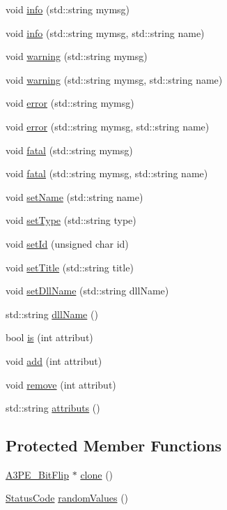 \begin{DoxyCompactItemize}
\item 
void \hyperlink{classObject_a644fd329ea4cb85f54fa6846484b84a8}{info} (std::string mymsg)
\item 
void \hyperlink{classObject_a1ca123253dfd30fc28b156f521dcbdae}{info} (std::string mymsg, std::string name)
\item 
void \hyperlink{classObject_a65cd4fda577711660821fd2cd5a3b4c9}{warning} (std::string mymsg)
\item 
void \hyperlink{classObject_a11f101db4dd73d9391b0231818881d86}{warning} (std::string mymsg, std::string name)
\item 
void \hyperlink{classObject_a204a95f57818c0f811933917a30eff45}{error} (std::string mymsg)
\item 
void \hyperlink{classObject_ad7f6c457733082efa2f9ff5f5c8e119a}{error} (std::string mymsg, std::string name)
\item 
void \hyperlink{classObject_aad5a16aac7516ce65bd5ec02ab07fc80}{fatal} (std::string mymsg)
\item 
void \hyperlink{classObject_ae62acd3d09f716220f75f252dc38bc9a}{fatal} (std::string mymsg, std::string name)
\item 
void \hyperlink{classObject_ae30fea75683c2d149b6b6d17c09ecd0c}{setName} (std::string name)
\item 
void \hyperlink{classObject_aae534cc9d982bcb9b99fd505f2e103a5}{setType} (std::string type)
\item 
void \hyperlink{classObject_a398fe08cba594a0ce6891d59fe4f159f}{setId} (unsigned char id)
\item 
void \hyperlink{classObject_a89557dbbad5bcaa02652f5d7fa35d20f}{setTitle} (std::string title)
\item 
void \hyperlink{classObject_a870c5af919958c2136623b2d7816d123}{setDllName} (std::string dllName)
\item 
std::string \hyperlink{classObject_a2e3947f2870094c332d7454117f3ec63}{dllName} ()
\item 
bool \hyperlink{classAttrib_a704f26af560909ad22065083bb7d4c34}{is} (int attribut)
\item 
void \hyperlink{classAttrib_a235f773af19c900264a190b00a3b4ad7}{add} (int attribut)
\item 
void \hyperlink{classAttrib_a7d4ef7e32d93cb287792b87b857e79f3}{remove} (int attribut)
\item 
std::string \hyperlink{classAttrib_aee7bbf16b144887f196e1341b24f8a26}{attributs} ()
\end{DoxyCompactItemize}
\subsection*{Protected Member Functions}
\begin{DoxyCompactItemize}
\item 
\hyperlink{classA3PE__BitFlip_1_1A3PE__BitFlip}{A3PE\_\-BitFlip} $\ast$ \hyperlink{classA3PE__BitFlip_a444f2b4fd5211e457105f13d19795211}{clone} ()
\item 
\hyperlink{classStatusCode}{StatusCode} \hyperlink{classA3PE__BitFlip_a57e668f5be18f8bc53f5c105735646bf}{randomValues} ()
\end{DoxyCompactItemize}
